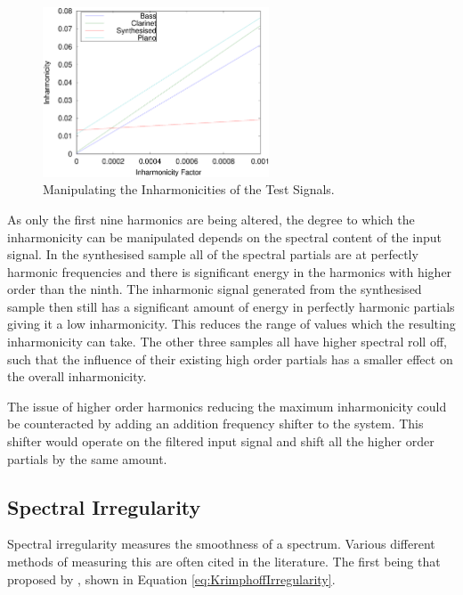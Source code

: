 			\begin{figure}[h!]
				\centering
				\includegraphics[width=0.6\textwidth]{chapter6/Images/MoveInharmonicities.eps}
				\caption{Manipulating the Inharmonicities of the Test Signals.}
				\label{fig:MoveInharmonicities}
			\end{figure}

			As only the first nine harmonics are being altered, the degree to which the inharmonicity can be
			manipulated depends on the spectral content of the input signal. In the synthesised sample all of
			the spectral partials are at perfectly harmonic frequencies and there is significant energy in the
			harmonics with higher order than the ninth. The inharmonic signal generated from the synthesised
			sample then still has a significant amount of energy in perfectly harmonic partials giving it a low
			inharmonicity. This reduces the range of values which the resulting inharmonicity can take. The
			other three samples all have higher spectral roll off, such that the influence of their existing
			high order partials has a smaller effect on the overall inharmonicity.

			The issue of higher order harmonics reducing the maximum inharmonicity could be counteracted by
			adding an addition frequency shifter to the system. This shifter would operate on the filtered
			input signal and shift all the higher order partials by the same amount.

	\subsection{Spectral Irregularity}
	\label{sec:FeatureControl-Parameterisation-Irregularity}
		Spectral irregularity measures the smoothness of a spectrum. Various different methods of measuring this
		are often cited in the literature. The first being that proposed by \citet{krimphoff1994caracterisation},
		shown in Equation \ref{eq:KrimphoffIrregularity}.

